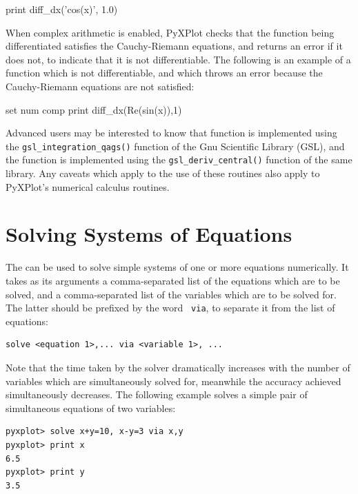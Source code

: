 \begin{dodo}
print diff\_dx('cos(x)', 1.0)
\end{dodo}

When complex arithmetic is enabled, PyXPlot checks that the function being
differentiated satisfies the Cauchy-Riemann equations, and returns an error if
it does not, to indicate that it is not differentiable.  The following is an
example of a function which is not differentiable, and which throws an error
because the Cauchy-Riemann equations are not satisfied:

\begin{dontdo}
set num comp\newline
print diff\_dx(Re(sin(x)),1)
\end{dontdo}

Advanced users may be interested to know that  function is
implemented using the {\tt gsl\_\-integration\_\-qags()} function of the Gnu
Scientific Library (GSL), and the  function is
implemented using the {\tt gsl\_\-deriv\_\-central()} function of the same library.
Any caveats which apply to the use of these routines also apply to PyXPlot's
numerical calculus routines.


\section{Solving Systems of Equations}

The  can be used to solve simple systems of one or more
equations numerically. It takes as its arguments a comma-separated list of the
equations which are to be solved, and a comma-separated list of the variables
which are to be solved for. The latter should be prefixed by the word {\tt
via}, to separate it from the list of equations:

\begin{verbatim}
solve <equation 1>,... via <variable 1>, ...
\end{verbatim}

Note that the time taken by the solver dramatically increases with the number
of variables which are simultaneously solved for, meanwhile the accuracy
achieved simultaneously decreases. The following example solves a simple pair
of simultaneous equations of two variables:

\begin{verbatim}
pyxplot> solve x+y=10, x-y=3 via x,y
pyxplot> print x
6.5
pyxplot> print y
3.5
\end{verbatim}

